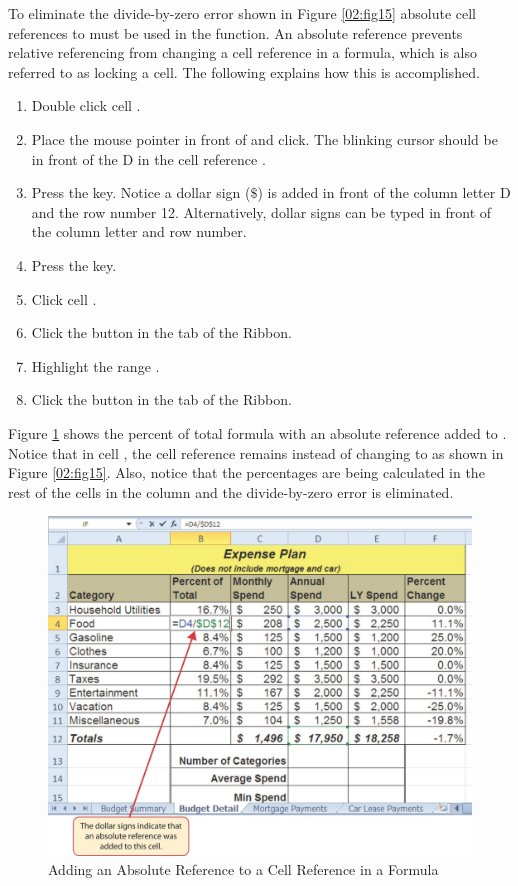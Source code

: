To eliminate the divide-by-zero error shown in Figure \ref{02:fig15} absolute cell references to  must be used in the function. An absolute reference prevents relative referencing from changing a cell reference in a formula, which is also referred to as locking a cell. The following explains how this is accomplished.

\begin{enumerate}
	\item Double click cell .
	\item Place the mouse pointer in front of  and click. The blinking cursor should be in front of the D in the cell reference .
	\item Press the  key. Notice a dollar sign ($ \$ $) is added in front of the column letter D and the row number 12. Alternatively, dollar signs can be typed in front of the column letter and row number.
	\item Press the  key.
	\item Click cell .
	\item Click the  button in the  tab of the Ribbon.
	\item Highlight the range .
	\item Click the  button in the  tab of the Ribbon.
\end{enumerate}

Figure \ref{02:fig16} shows the percent of total formula with an absolute reference added to . Notice that in cell , the cell reference remains  instead of changing to  as shown in Figure \ref{02:fig15}. Also, notice that the percentages are being calculated in the rest of the cells in the column and the divide-by-zero error is eliminated.

\begin{figure}[H]
	\centering
	\includegraphics[width=\maxwidth{.95\linewidth}]{gfx/ch02_fig16}
	\caption{Adding an Absolute Reference to a Cell Reference in a Formula}
	\label{02:fig16}
\end{figure}

